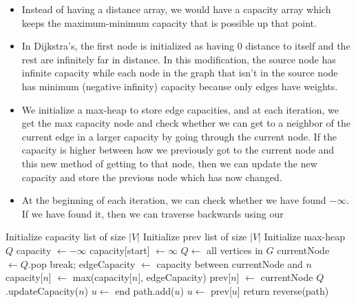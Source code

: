 \documentclass[12pt]{article}
\begin{document}
\begin{itemize}
    \item Instead of having a distance array, we would have a capacity array which keeps the maximum-minimum capacity that is possible up that point. 
    \item In Dijkstra's, the first node is initialized as having 0 distance to itself and the rest are infinitely far in distance. In this modification, the source node has infinite capacity while each node in the graph that isn't in the source node has minimum (negative infinity) capacity because only edges have weights.
    \item We initialize a max-heap to store edge capacities, and at each iteration, we get the max capacity node and check whether we can get to a neighbor of the current edge in a larger capacity by going through the current node. If the capacity is higher between how we previously got to the current node and this new method of getting to that node, then we can update the new capacity and store the previous node which has now changed.
    \item At the beginning of each iteration, we can check whether we have found $-\infty$. If we have found it, then we can traverse backwards using our 
\end{itemize}
\begin{algorithmic}
        \State Initialize capacity list of size $|V|$
        \State Initialize prev list of size $|V|$
        \State Initialize max-heap $Q$
        \State capacity $\gets -\infty$ 
        \State capacity[start] $\gets \infty$
        \State $Q \gets $ all vertices in $G$
            \State currentNode $\gets Q$.pop
                \State break;
            \EndIf
                \State edgeCapacity $\gets$ capacity between currentNode and $n$
                    \State capacity[$n$] $\gets$ max(capacity[$n$], edgeCapacity)
                    \State prev[$n$] $\gets$ currentNode
                    \State $Q$.updateCapacity($n$)
                \EndIf
            \EndFor
        \EndWhile
        \State $u\gets $ end
            \State path.add($u$)
            \State $u\gets $ prev[$u$]
        \EndWhile
        \State return reverse(path)
    \EndProcedure
\end{algorithmic}
\end{document}
